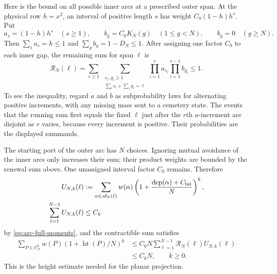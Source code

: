 Here is the bound on all possible inner arcs at a prescribed outer
span. At the physical row $h=x^2$, an interval of positive length $s$
has weight $C_0(1-h)h^s$. Put
\[
 a_s=(1-h)h^s\quad(s\ge1),\qquad
 b_g=C_0K_N(g)\quad(1\le g<N),\qquad b_g=0\quad(g\ge N).
\]
Then $\sum_s a_s=h\le1$ and $\sum_g b_g=1-D_N\le1$. After assigning one
factor $C_0$ to each inner gap, the remaining sum for span $\ell$ is
\[
 \mathcal R_N(\ell)=
 \sum_{r\ge1}\ \sum_{\substack{s_i,g_i\ge1\\
                     \sum_i s_i+\sum_i g_i=\ell}}
       \prod_{i=1}^r a_{s_i}\prod_{i=1}^{r-1}b_{g_i}\le1.
\]
To see the inequality, regard $a$ and $b$ as subprobability laws for
alternating positive increments, with any missing mass sent to a
cemetery state. The events that the running sum first equals the fixed
$\ell$ just after the $r$th $a$-increment are disjoint as $r$ varies,
because every increment is positive. Their probabilities are the
displayed summands.

The starting port of the outer arc has $N$ choices. Ignoring mutual
avoidance of the inner arcs only increases their sum; their product
weights are bounded by the renewal sum above. One unassigned interval
factor $C_0$ remains. Therefore
\[
 \begin{split}
 U_{N,k}(\ell)&:=
       \sum_{\alpha\in\mathscr A_N(\ell)}w(\alpha)
          \left(1+\frac{\operatorname{dep}(\alpha)+C_{\rm lat}}N\right)^k,\\
 \sum_{\ell=1}^{N-1}U_{N,k}(\ell)&\le C_k
 \end{split}
\]
by \eqref{eq:arc-full-moments}, and the contractible sum satisfies
\begin{equation}\label{eq:contractible-height-moments}
 \begin{split}
 \sum_{P\in\mathscr C_N^0}w(P)(1+\operatorname{ht}(P)/N)^k
 &\le C_0N\sum_{\ell=1}^{N-1}\mathcal R_N(\ell)U_{N,k}(\ell)\\
 &\le C_kN,\qquad k\ge0.
 \end{split}
\end{equation}
This is the height estimate needed for the planar projection.

